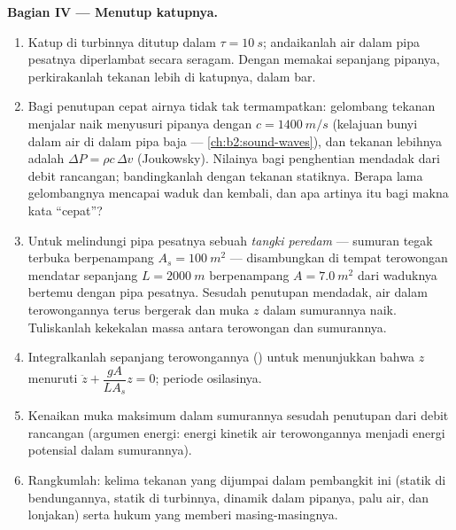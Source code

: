 \begin{problem}
\medskip
\noindent\textbf{Bagian IV --- Menutup katupnya.}
\begin{enumerate}[resume]
  \item Katup di turbinnya ditutup dalam $\tau = \qty{10}{s}$; andaikanlah
        air dalam pipa pesatnya diperlambat secara seragam. Dengan
        memakai  sepanjang pipanya, perkirakanlah tekanan lebih di
        katupnya, dalam bar.
  \item Bagi penutupan cepat airnya tidak tak termampatkan: gelombang
        tekanan menjalar naik menyusuri pipanya dengan $c = \qty{1400}{m/s}$
        (kelajuan bunyi dalam air di dalam pipa baja ---
        \cref{ch:b2:sound-waves}), dan tekanan lebihnya adalah
        $\Delta P = \rho c\,\Delta v$ (Joukowsky). Nilainya bagi
        penghentian mendadak dari debit rancangan; bandingkanlah dengan
        tekanan statiknya. Berapa lama gelombangnya mencapai waduk dan
        kembali, dan apa artinya itu bagi makna kata ``cepat''?
  \item Untuk melindungi pipa pesatnya sebuah \emph{tangki peredam} ---
        sumuran tegak terbuka berpenampang $A_s = \qty{100}{m^2}$ ---
        disambungkan di tempat terowongan mendatar sepanjang
        $L = \qty{2000}{m}$ berpenampang $A =
        \qty{7.0}{m^2}$ dari waduknya bertemu dengan pipa pesatnya.
        Sesudah penutupan mendadak, air dalam terowongannya terus
        bergerak dan muka $z$ dalam sumurannya naik. Tuliskanlah
        kekekalan massa antara terowongan dan sumurannya.
  \item Integralkanlah  sepanjang terowongannya ()
        untuk menunjukkan bahwa $z$ menuruti
        $\ddot z + \dfrac{gA}{LA_s}z = 0$; periode osilasinya.
  \item Kenaikan muka maksimum dalam sumurannya sesudah penutupan dari
        debit rancangan (argumen energi: energi kinetik air terowongannya
        menjadi energi potensial dalam sumurannya).
  \item Rangkumlah: kelima tekanan yang dijumpai dalam pembangkit ini
        (statik di bendungannya, statik di turbinnya, dinamik dalam
        pipanya, palu air, dan lonjakan) serta hukum yang memberi
        masing-masingnya.
\end{enumerate}
\end{problem}
